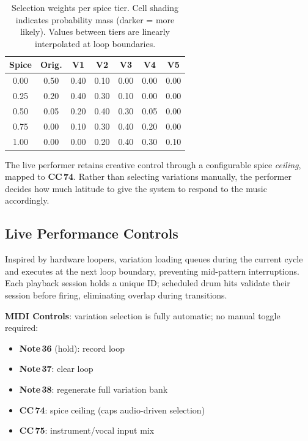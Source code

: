 \documentclass{aimc2026}
\begin{document}
\begin{table}[h]
\caption{Selection weights per spice tier. Cell shading indicates probability mass (darker = more likely). Values between tiers are linearly interpolated at loop boundaries.}
\label{tab:weights}
\centering
\small
\renewcommand{\arraystretch}{0.85}
\begin{tabular}{ccccccc}
\toprule
\textbf{Spice} & \textbf{Orig.} & \textbf{V1} & \textbf{V2} & \textbf{V3} & \textbf{V4} & \textbf{V5} \\
\midrule
0.00 & \cellcolor{red!60}0.50 & \cellcolor{red!48}0.40 & \cellcolor{red!12}0.10 & 0.00 & 0.00 & 0.00 \\
0.25 & \cellcolor{red!24}0.20 & \cellcolor{red!48}0.40 & \cellcolor{red!36}0.30 & \cellcolor{red!12}0.10 & 0.00 & 0.00 \\
0.50 & \cellcolor{red!6}0.05  & \cellcolor{red!24}0.20 & \cellcolor{red!48}0.40 & \cellcolor{red!36}0.30 & \cellcolor{red!6}0.05 & 0.00 \\
0.75 & 0.00 & \cellcolor{red!12}0.10 & \cellcolor{red!36}0.30 & \cellcolor{red!48}0.40 & \cellcolor{red!24}0.20 & 0.00 \\
1.00 & 0.00 & 0.00 & \cellcolor{red!24}0.20 & \cellcolor{red!48}0.40 & \cellcolor{red!36}0.30 & \cellcolor{red!12}0.10 \\
\bottomrule
\end{tabular}
\end{table}

The live performer retains creative control through a configurable spice \emph{ceiling}, mapped to \textbf{CC\,74}. Rather than selecting variations manually, the performer decides how much latitude to give the system to respond to the music accordingly.

\subsection{Live Performance Controls}

Inspired by hardware loopers, variation loading queues during the current cycle and executes at the next loop boundary, preventing mid-pattern interruptions. Each playback session holds a unique ID; scheduled drum hits validate their session before firing, eliminating overlap during transitions.

\textbf{MIDI Controls}: variation selection is fully automatic; no manual toggle required:
\begin{itemize}
  \item \textbf{Note\,36} (hold): record loop
  \item \textbf{Note\,37}: clear loop
  \item \textbf{Note\,38}: regenerate full variation bank
  \item \textbf{CC\,74}: spice ceiling (caps audio-driven selection)
  \item \textbf{CC\,75}: instrument/vocal input mix
\end{itemize}
\end{document}
